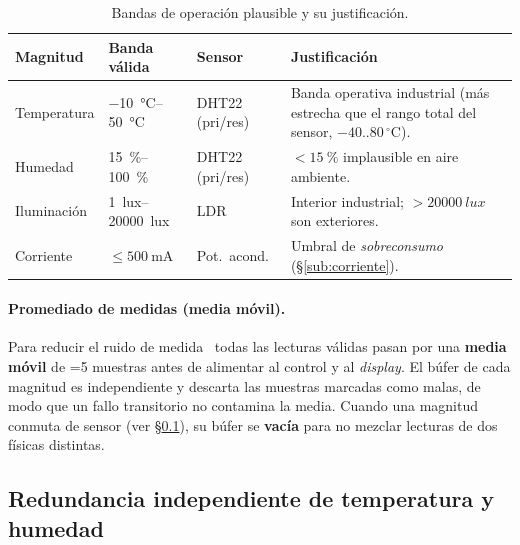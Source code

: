 \begin{table}[H]
  \centering
  \small
  \begin{tabular}{p{} p{} p{} p{}}
    \toprule
    \textbf{Magnitud} & \textbf{Banda válida} & \textbf{Sensor} & \textbf{Justificación} \\
    \midrule
    Temperatura  & \SIrange{-10}{50}{\celsius} & DHT22 (pri/res)
                 & Banda operativa industrial (más estrecha que el rango total
                   del sensor, $-40$..$80\,^{\circ}$C). \\
    Humedad      & \SIrange{15}{100}{\percent} & DHT22 (pri/res)
                 & $<\SI{15}{\percent}$ implausible en aire ambiente. \\
    Iluminación  & \SIrange{1}{20000}{lux}     & LDR
                 & Interior industrial; $>\SI{20000}{lux}$ son exteriores. \\
    Corriente    & $\leq \SI{500}{\milli\ampere}$ & Pot.\ acond.
                 & Umbral de \emph{sobreconsumo} (§\ref{sub:corriente}). \\
    \bottomrule
  \end{tabular}
  \caption{Bandas de operación plausible y su justificación.}
  \label{tab:bandas}
\end{table}

\paragraph{Promediado de medidas (media móvil).}
\label{sub:avg}

Para reducir el ruido de medida~\cite{corona2014instrumentacion} todas las
lecturas válidas pasan por una \textbf{media móvil} de
=5 muestras antes de alimentar al control y al
\emph{display}. El búfer de cada magnitud es independiente y descarta las
muestras marcadas como malas, de modo que un fallo transitorio no contamina
la media. Cuando una magnitud conmuta de sensor (ver §\ref{sub:redund}), su
búfer se \textbf{vacía} para no mezclar lecturas de dos físicas distintas.

\subsection{Redundancia independiente de temperatura y humedad}\label{sub:redund}

